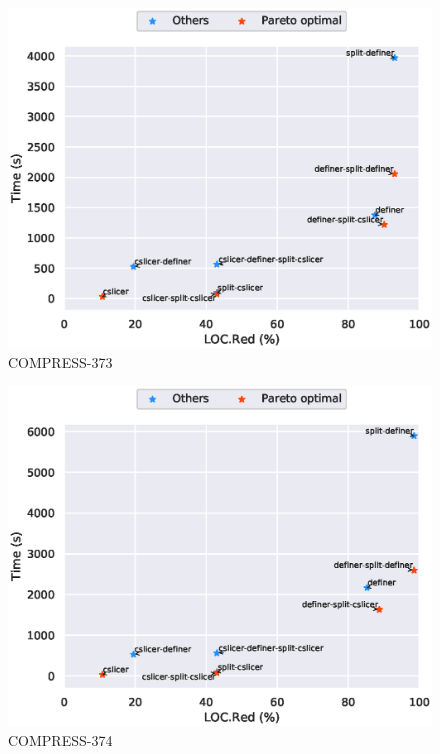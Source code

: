 \begin{figure}
\includegraphics[scale=0.7]{plots/pareto/COMPRESS-373-pareto}
\caption{COMPRESS-373}
\end{figure}
\begin{figure}
\includegraphics[scale=0.7]{plots/pareto/COMPRESS-374-pareto}
\caption{COMPRESS-374}
\end{figure}
